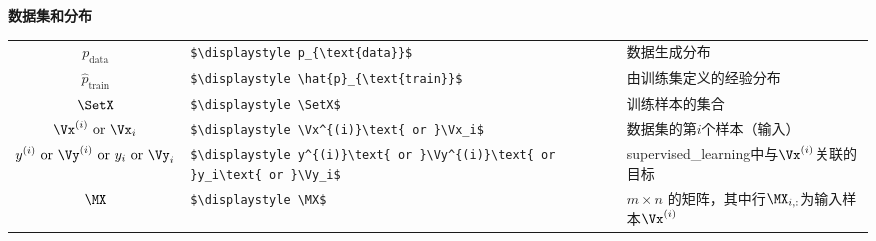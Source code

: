 \vspace{\notationgap}
\begin{minipage}{\textwidth}
\centerline{\bf 数据集和分布}
\bgroup
\def\arraystretch{1.5}
\begin{tabular}{clp{3.25in}}
$\displaystyle p_{\text{data}}$ 				&\lstinline!$\displaystyle p_{\text{data}}$ 			!					& 数据生成分布 \\
$\displaystyle \hat{p}_{\text{train}}$ 			&\lstinline!$\displaystyle \hat{p}_{\text{train}}$ 		!						& 由训练集定义的经验分布 \\
$\displaystyle \SetX$ 							&\lstinline!$\displaystyle \SetX$ 						!		& 训练样本的集合 \\
$\displaystyle \Vx^{(i)}\text{ or }\Vx_i$ 						&\lstinline!$\displaystyle \Vx^{(i)}\text{ or }\Vx_i$ 					!			& 数据集的第$i$个样本（输入）\\
$\displaystyle y^{(i)}\text{ or }\Vy^{(i)}\text{ or }y_i\text{ or }\Vy_i$ 	&\lstinline!$\displaystyle y^{(i)}\text{ or }\Vy^{(i)}\text{ or }y_i\text{ or }\Vy_i$ !								& \gls{supervised_learning}中与$\Vx^{(i)}$关联的目标 \\
$\displaystyle \MX$ 							&\lstinline!$\displaystyle \MX$ 						!		& $m \times n$ 的矩阵，其中行$\MX_{i,:}$为输入样本$\Vx^{(i)}$ \\
\end{tabular} 
\egroup
\end{minipage}
